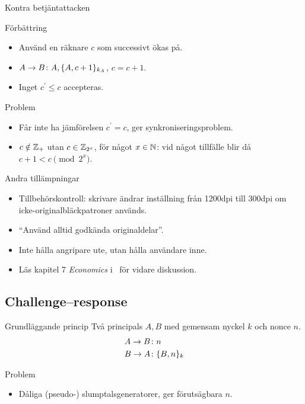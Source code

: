 \begin{frame}{Kontra betjäntattacken}
  \begin{block}{Förbättring}
    \begin{itemize}
      \item Använd en räknare \(c\) som successivt ökas på.
      \item \(A\to B\colon A, \{A, c+1\}_{k_A}\), \(c = c+1\).
      \item Inget \(c^\prime \leq c\) accepteras.
    \end{itemize}
  \end{block}
  \begin{block}{Problem}
    \begin{itemize}
      \item Får inte ha jämförelsen \(c^\prime = c\), ger 
        synkroniseringsproblem.
      \item \(c\notin \operatorname{\mathbb{Z}}_+\) utan \(c\in \operatorname{\mathbb{Z}}_{2^x}\), för något \(x\in \operatorname{\mathbb{N}}\): vid 
        något tillfälle blir då \(c+1 < c \pmod{2^x}\).
    \end{itemize}
  \end{block}
\end{frame}

\begin{frame}{Andra tillämpningar}
  \begin{itemize}
    \item Tillbehörskontroll: skrivare ändrar inställning från \unit{1200}{dpi} 
      till \unit{300}{dpi} om icke-originalbläckpatroner används.
    \item \enquote{Använd alltid godkända originaldelar}.
    \item Inte hålla angripare ute, utan hålla användare inne.
    \item Läs kapitel 7 \emph{Economics} i~\cite{Anderson2008sea} för vidare 
      diskussion.
  \end{itemize}
\end{frame}

\subsection{Challenge--response}

\begin{frame}
  \begin{block}{Grundläggande princip}
    Två principals \(A, B\) med gemensam nyckel \(k\) och nonce \(n\).
    \begin{align*}
      A\to B &\colon n \\
      B\to A &\colon \{B, n\}_{k}
    \end{align*}
  \end{block}
  \begin{block}{Problem}
    \begin{itemize}
      \item Dåliga (pseudo-) slumptalsgeneratorer, ger förutsägbara \(n\).
    \end{itemize}
  \end{block}
\end{frame}

